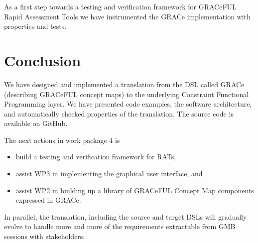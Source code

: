 \documentclass{article}
\begin{document}
As a first step towards a testing and verification framework for
GRACeFUL Rapid Assessment Tools we have instrumented the GRACe
implementation with properties and tests.
%


\section{Conclusion}
\label{sec:conclusion}

We have designed and implemented a translation from the DSL called
GRACe (describing GRACeFUL concept maps) to the underlying Constraint
Functional Programming layer.
%
We have presented code examples, the software architecture, and
automatically checked properties of the translation.
%
The source code is available on GitHub.

The next actions in work package 4 is
\begin{itemize}
\item build a testing and verification framework for RATs,
\item assist WP3 in implementing the graphical user interface, and
\item assist WP2 in building up a library of GRACeFUL Concept Map
  components expressed in GRACe.
\end{itemize}
%
In parallel, the translation, including the source and target DSLs
will gradually evolve to handle more and more of the requirements
extractable from GMB sessions with stakeholders.

\appendix





\end{document}
